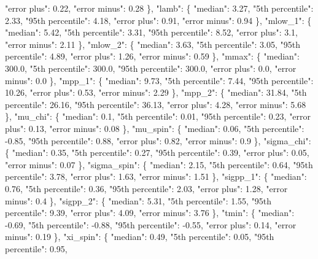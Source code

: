 {{        "error plus": 0.22, %
        "error minus": 0.28%
      \}, %
      "lamb": \{%
        "median": 3.27, %
        "5th percentile": 2.33, %
        "95th percentile": 4.18, %
        "error plus": 0.91, %
        "error minus": 0.94%
      \}, %
      "mlow\_1": \{%
        "median": 5.42, %
        "5th percentile": 3.31, %
        "95th percentile": 8.52, %
        "error plus": 3.1, %
        "error minus": 2.11%
      \}, %
      "mlow\_2": \{%
        "median": 3.63, %
        "5th percentile": 3.05, %
        "95th percentile": 4.89, %
        "error plus": 1.26, %
        "error minus": 0.59%
      \}, %
      "mmax": \{%
        "median": 300.0, %
        "5th percentile": 300.0, %
        "95th percentile": 300.0, %
        "error plus": 0.0, %
        "error minus": 0.0%
      \}, %
      "mpp\_1": \{%
        "median": 9.73, %
        "5th percentile": 7.44, %
        "95th percentile": 10.26, %
        "error plus": 0.53, %
        "error minus": 2.29%
      \}, %
      "mpp\_2": \{%
        "median": 31.84, %
        "5th percentile": 26.16, %
        "95th percentile": 36.13, %
        "error plus": 4.28, %
        "error minus": 5.68%
      \}, %
      "mu\_chi": \{%
        "median": 0.1, %
        "5th percentile": 0.01, %
        "95th percentile": 0.23, %
        "error plus": 0.13, %
        "error minus": 0.08%
      \}, %
      "mu\_spin": \{%
        "median": 0.06, %
        "5th percentile": {-}0.85, %
        "95th percentile": 0.88, %
        "error plus": 0.82, %
        "error minus": 0.9%
      \}, %
      "sigma\_chi": \{%
        "median": 0.35, %
        "5th percentile": 0.27, %
        "95th percentile": 0.39, %
        "error plus": 0.05, %
        "error minus": 0.07%
      \}, %
      "sigma\_spin": \{%
        "median": 2.15, %
        "5th percentile": 0.64, %
        "95th percentile": 3.78, %
        "error plus": 1.63, %
        "error minus": 1.51%
      \}, %
      "sigpp\_1": \{%
        "median": 0.76, %
        "5th percentile": 0.36, %
        "95th percentile": 2.03, %
        "error plus": 1.28, %
        "error minus": 0.4%
      \}, %
      "sigpp\_2": \{%
        "median": 5.31, %
        "5th percentile": 1.55, %
        "95th percentile": 9.39, %
        "error plus": 4.09, %
        "error minus": 3.76%
      \}, %
      "tmin": \{%
        "median": {-}0.69, %
        "5th percentile": {-}0.88, %
        "95th percentile": {-}0.55, %
        "error plus": 0.14, %
        "error minus": 0.19%
      \}, %
      "xi\_spin": \{%
        "median": 0.49, %
        "5th percentile": 0.05, %
        "95th percentile": 0.95, %
}}
